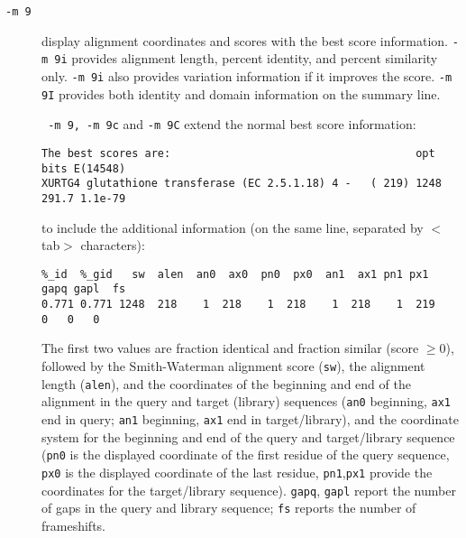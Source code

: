 \documentclass[11pt]{article}
\begin{document}
\begin{description}
\item[\texttt{-m 9}] display alignment coordinates and scores with the
  best score information.  \texttt{-m 9i} provides alignment length,
  percent identity, and percent similarity only. \texttt{-m 9i} also
  provides variation information if it improves the score. \texttt{-m
    9I} provides both identity and domain information on the summary
  line.

 \texttt{ -m 9, -m 9c} and \texttt{-m 9C} extend the normal best score information:
\begin{footnotesize}
\begin{verbatim}
The best scores are:                                      opt bits E(14548)
XURTG4 glutathione transferase (EC 2.5.1.18) 4 -   ( 219) 1248 291.7 1.1e-79
\end{verbatim}
\end{footnotesize}

to include the additional information (on the same line, separated by
$<$tab$>$ characters):
\begin{footnotesize}
\begin{verbatim}
%_id  %_gid   sw  alen  an0  ax0  pn0  px0  an1  ax1 pn1 px1 gapq gapl  fs
0.771 0.771 1248  218    1  218    1  218    1  218    1  219   0   0   0
\end{verbatim}
\end{footnotesize}

The first two values are fraction identical and fraction similar
(score $\ge 0$), followed by the Smith-Waterman alignment score (\texttt{sw}), the
alignment length (\texttt{alen}), and the coordinates of the beginning
and end of the alignment in the query and target (library) sequences
(\texttt{an0} beginning, \texttt{ax1} end in query; \texttt{an1}
beginning, \texttt{ax1} end in target/library), and the coordinate
system for the beginning and end of the query and target/library
sequence (\texttt{pn0} is the displayed coordinate of the first
residue of the query sequence, \texttt{px0} is the displayed
coordinate of the last residue, \texttt{pn1},\texttt{px1} provide the
coordinates for the target/library sequence). \texttt{gapq},
\texttt{gapl} report the number of gaps in the query and library
sequence; \texttt{fs} reports the number of frameshifts.


\end{description}
\end{document}

